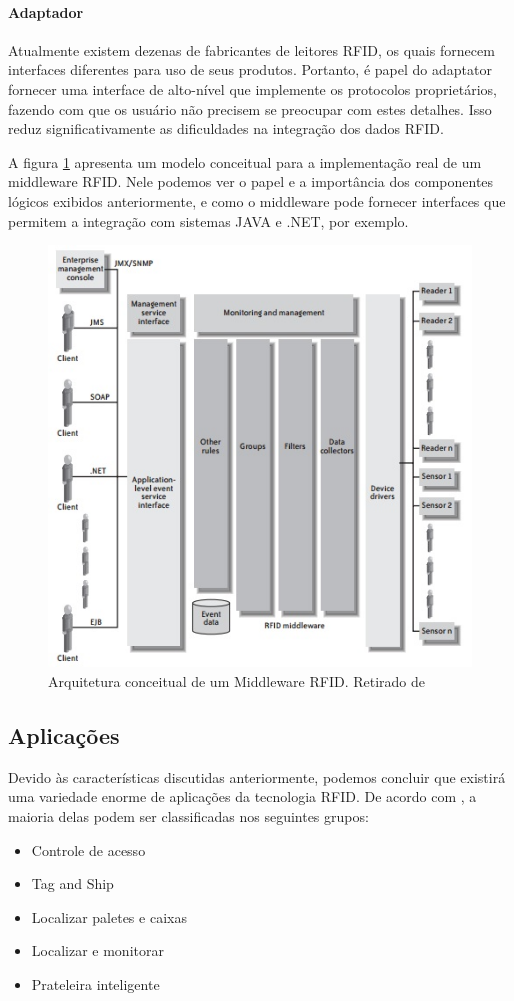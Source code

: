 	\paragraph{Adaptador} Atualmente existem dezenas de fabricantes de leitores RFID, os quais fornecem interfaces diferentes para uso de seus produtos. Portanto, é papel do adaptator fornecer uma interface de alto-nível que implemente os protocolos proprietários, fazendo com que os usuário não precisem se preocupar com estes detalhes. Isso reduz significativamente as dificuldades na integração dos dados RFID.
	
	A figura \ref{fig:midarc} apresenta um modelo conceitual para a implementação real de um middleware RFID. Nele podemos ver o papel e a importância dos componentes lógicos exibidos anteriormente, e como o middleware pode fornecer interfaces que permitem a integração com sistemas JAVA e .NET, por exemplo.
	
		\begin{figure}[h!]
			\centering
			\includegraphics[width=0.5\linewidth]{midarc}
			\caption{Arquitetura conceitual de um Middleware RFID. Retirado de \cite{rfidbook}}
			\label{fig:midarc}
		\end{figure}
	
	\subsection{Aplicações}
	Devido às características discutidas anteriormente, podemos concluir que existirá uma variedade enorme de aplicações da tecnologia RFID. De acordo com \cite{rfidbook}, a maioria delas podem ser classificadas nos seguintes grupos:
	\begin{itemize}
		\item Controle de acesso
		\item Tag and Ship
		\item Localizar paletes e caixas
		\item Localizar e monitorar
		\item Prateleira inteligente
	\end{itemize}
	
